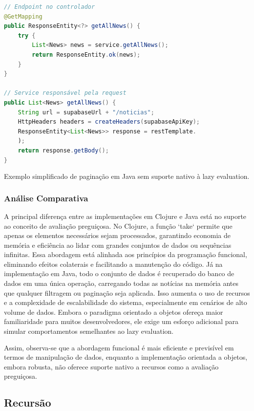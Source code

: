 \begin{tcolorbox}[colback=gray!5!white, colframe=gray!75!black, title={Quadro 11 - Paginação em Java sem Lazy Evaluation}]
\begin{lstlisting}[language=Java]
// Endpoint no controlador
@GetMapping
public ResponseEntity<?> getAllNews() {
    try {
        List<News> news = service.getAllNews(); 
        return ResponseEntity.ok(news); 
    }
}

// Service responsável pela request
public List<News> getAllNews() {
    String url = supabaseUrl + "/noticias";
    HttpHeaders headers = createHeaders(supabaseApiKey); 
    ResponseEntity<List<News>> response = restTemplate.
    );
    return response.getBody(); 
}
\end{lstlisting}
\caption{Exemplo simplificado de paginação em Java sem suporte nativo à lazy evaluation.}
\end{tcolorbox}


\subsubsection*{Análise Comparativa}

A principal diferença entre as implementações em Clojure e Java está no suporte ao conceito de avaliação preguiçosa. No Clojure, a função `take` permite que apenas os elementos necessários sejam processados, garantindo economia de memória e eficiência ao lidar com grandes conjuntos de dados ou sequências infinitas. Essa abordagem está alinhada aos princípios da programação funcional, eliminando efeitos colaterais e facilitando a manutenção do código. Já na implementação em Java, todo o conjunto de dados é recuperado do banco de dados em uma única operação, carregando todas as notícias na memória antes que qualquer filtragem ou paginação seja aplicada. Isso aumenta o uso de recursos e a complexidade de escalabilidade do sistema, especialmente em cenários de alto volume de dados. Embora o paradigma orientado a objetos ofereça maior familiaridade para muitos desenvolvedores, ele exige um esforço adicional para simular comportamentos semelhantes ao lazy evaluation.

Assim, observa-se que a abordagem funcional é mais eficiente e previsível em termos de manipulação de dados, enquanto a implementação orientada a objetos, embora robusta, não oferece suporte nativo a recursos como a avaliação preguiçosa.

\subsection{Recursão}

